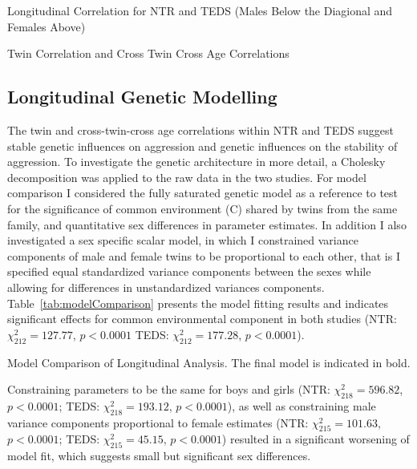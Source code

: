 \begin{table}
  \centering
  
  \caption[Longitudinal Correlation]{Longitudinal Correlation for NTR and TEDS (Males Below the Diagional and Females Above)}\label{tab:long_correlation}
\end{table}

\begin{landscape}
\begin{table}
  \centering
  \caption[Twin Correlation]{Twin Correlation and Cross Twin Cross Age Correlations}\label{tab:cross_corr}
\end{table}
\end{landscape}

\subsection{Longitudinal Genetic Modelling}
The twin and cross-twin-cross age correlations within NTR and TEDS suggest stable genetic influences on aggression and genetic influences on the stability of aggression.
To investigate the genetic architecture in more detail, a Cholesky decomposition was applied to the raw data in the two studies.
For model comparison I considered the fully saturated genetic model as a reference to test for the significance of common environment (C) shared by twins from the same family, and quantitative sex differences in parameter estimates.
In addition I also investigated a sex specific scalar model, in which I constrained variance components of male and female twins to be proportional to each other, that is I specified equal standardized variance components between the sexes while allowing for differences in unstandardized variances components.
Table~\ref{tab:modelComparison} presents the model fitting results and indicates significant effects for common environmental component in both studies (NTR: $\chi^2_{212}= 127.77$, $p<0.0001$ TEDS: $\chi^2_{212}= 177.28$, $p<0.0001$).
\begin{table}
  \centering
  \caption[Model Comparison of Longitudinal Analysis]{Model Comparison of Longitudinal Analysis.
  The final model is indicated in bold.}\label{tab:modelComparison}
\end{table}
Constraining parameters to be the same for boys and girls (NTR: $\chi^2_{218}= 596.82$, $p<0.0001$; TEDS: $\chi^2_{218}= 193.12$, $p<0.0001$), as well as constraining male variance components proportional to female estimates (NTR: $\chi^2_{215}= 101.63$, $p<0.0001$; TEDS: $\chi^2_{215}= 45.15$, $p<0.0001$) resulted in a significant worsening of model fit, which suggests small but significant sex differences.
